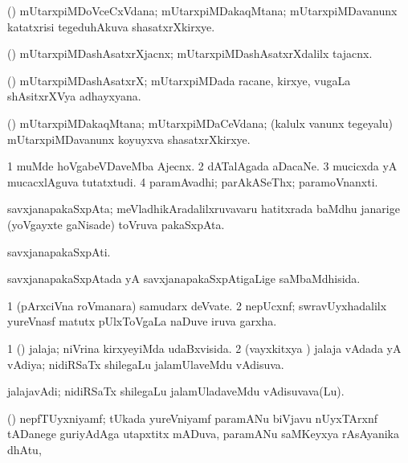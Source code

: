 \bentry
{}
\gl{\nA}
\bmng
(\veYshA) mUtarxpiMDoVceCxVdana; mUtarxpiMDakaqMtana; mUtarxpiMDavanunx katatxrisi tegeduhAkuva shasatxrXkirxye. 
\emng
\eentry

\bentry
{}
\gl{\nA}
\bmng
(\veYshA) mUtarxpiMDashAsatxrXjacnx; mUtarxpiMDashAsatxrXdalilx tajacnx. 
\emng
\eentry

\bentry
{}
\gl{\nA}
\bmng
(\veYshA) mUtarxpiMDashAsatxrX; mUtarxpiMDada racane, kirxye, \mo vugaLa shAsitxrXVya adhayxyana. 
\emng
\eentry

\bentry
{}
\gl{\nA}
\bmng
(\veYshA) mUtarxpiMDakaqMtana; mUtarxpiMDaCeVdana; (kalulx \mo vanunx tegeyalu) mUtarxpiMDavanunx koyuyxva shasatxrXkirxye. 
\emng
\eentry

\bentry
{}
\gl{\nA}
\expl{\Latin}
\bmng
\bnum
\num{1} muMde hoVgabeVDaveMba Ajecnx. 
\num{2} dATalAgada aDacaNe. 
\num{3} mucicxda yA mucacxlAguva tutatxtudi. 
\num{4} paramAvadhi; parAkASeThx; paramoVnanxti. 
\enum
\emng
\eentry

\bentry
{}
\gl{\nA}
\bmng
savxjanapakaSxpAta; meVladhikAradalilxruvavaru hatitxrada baMdhu janarige (yoVgayxte gaNisade) toVruva pakaSxpAta. 
\emng
\eentry

\bentry
{}
\gl{\nA}
\bmng
savxjanapakaSxpAti. 
\emng
\eentry

\bentry
{}
\gl{\gu}
\bmng
savxjanapakaSxpAtada yA savxjanapakaSxpAtigaLige saMbaMdhisida. 
\emng
\eentry

\bentry
{}
\gl{\nA}
\bmng
\bnum
\num{1} (pArxciVna roVmanara) samudarx deVvate. 
\num{2} nepUcxnf; swravUyxhadalilx yureVnasf matutx pUlxToVgaLa naDuve iruva garxha. 
\enum
\emng
\eentry

\bentry
{}
\gl{\gu}
\bmng
\bnum
\num{1} (\BUvi) jalaja; niVrina kirxyeyiMda udaBxvisida. 
\num{2} (vayxkitxya \vi) jalaja vAdada yA vAdiya; nidiRSaTx shilegaLu jalamUlaveMdu vAdisuva. 
\enum
\emng
\eentry

\bentry
{}
\gl{\nA}
\bmng
jalajavAdi; nidiRSaTx shilegaLu jalamUladaveMdu vAdisuvava(Lu). 
\emng
\eentry

\bentry
{}
\gl{\nA}
\bmng
(\ravi) nepfTUyxniyamf;  tUkada yureVniyamf paramANu biVjavu nUyxTArxnf tADanege guriyAdAga utapxtitx mADuva,  paramANu saMKeyxya rAsAyanika dhAtu, \saMkeV {} 
\emng
\eentry

